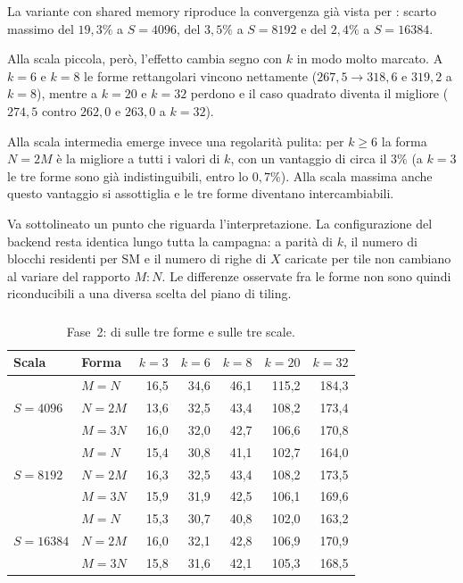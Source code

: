 La variante con shared memory riproduce la convergenza già vista per
: scarto massimo del $19{,}3\%$ a $S=4096$, del
$3{,}5\%$ a $S=8192$ e del $2{,}4\%$ a $S=\num{16384}$.

Alla scala piccola, però, l'effetto cambia segno con $k$ in modo molto
marcato. A $k=6$ e $k=8$ le forme rettangolari vincono nettamente
($267{,}5 \rightarrow 318{,}6$ e $319{,}2$ a $k=8$), mentre a $k=20$ e $k=32$
perdono e il caso quadrato diventa il migliore ($274{,}5$ contro $262{,}0$ e
$263{,}0$ a $k=32$).

Alla scala intermedia emerge invece una regolarità pulita: per $k\ge6$ la
forma $N=2M$ è la migliore a tutti i valori di $k$, con un vantaggio di circa
il $3\%$ (a $k=3$ le tre forme sono già indistinguibili, entro lo $0{,}7\%$). Alla scala massima anche questo vantaggio si assottiglia e le tre
forme diventano intercambiabili.

Va sottolineato un punto che riguarda l'interpretazione. La configurazione del
backend resta identica lungo tutta la campagna: a parità di $k$, il numero di
blocchi residenti per SM e il numero di righe di $X$ caricate per tile non
cambiano al variare del rapporto $M{:}N$. Le differenze osservate fra le forme
non sono quindi riconducibili a una diversa scelta del piano di tiling.

\subsubsection{}

\begin{table}[H]
\centering
\footnotesize
\caption{Fase~2:  di  sulle tre
forme e sulle tre scale.}
\label{tab:ris-fase2-cublas}
\begin{tabular}{@{}llrrrrr@{}}
\toprule
\textbf{Scala} & \textbf{Forma}
& $k=3$ & $k=6$ & $k=8$ & $k=20$ & $k=32$ \\
\midrule

\multirow{3}{*}{$S=4096$}
& $M=N$  & 16,5 & 34,6 & 46,1 & 115,2 & 184,3 \\
& $N=2M$ & 13,6 & 32,5 & 43,4 & 108,2 & 173,4 \\
& $M=3N$ & 16,0 & 32,0 & 42,7 & 106,6 & 170,8 \\

\midrule

\multirow{3}{*}{$S=8192$}
& $M=N$  & 15,4 & 30,8 & 41,1 & 102,7 & 164,0 \\
& $N=2M$ & 16,3 & 32,5 & 43,4 & 108,2 & 173,5 \\
& $M=3N$ & 15,9 & 31,9 & 42,5 & 106,1 & 169,6 \\

\midrule

\multirow{3}{*}{$S=\num{16384}$}
& $M=N$  & 15,3 & 30,7 & 40,8 & 102,0 & 163,2 \\
& $N=2M$ & 16,0 & 32,1 & 42,8 & 106,9 & 170,9 \\
& $M=3N$ & 15,8 & 31,6 & 42,1 & 105,3 & 168,5 \\

\bottomrule
\end{tabular}
\end{table}

